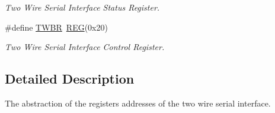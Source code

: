 \begin{DoxyCompactItemize}
\begin{DoxyCompactList}\small\item\em Two Wire Serial Interface Status Register. \end{DoxyCompactList}\item 
\hypertarget{group__TWIMCAL_ga9414c36e34a6646956e4093b29328ad9}{\#define \hyperlink{group__TWIMCAL_ga9414c36e34a6646956e4093b29328ad9}{T\+W\+B\+R}~\hyperlink{group__MCAL_ga72e45020e46f285689db51c46f273403}{R\+E\+G}(0x20)}\label{group__TWIMCAL_ga9414c36e34a6646956e4093b29328ad9}

\begin{DoxyCompactList}\small\item\em Two Wire Serial Interface Control Register. \end{DoxyCompactList}\end{DoxyCompactItemize}


\subsection{Detailed Description}
The abstraction of the registers addresses of the two wire serial interface. 

